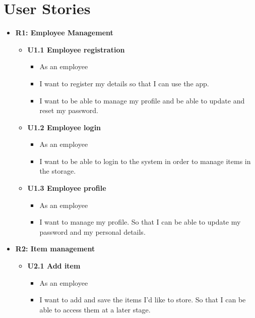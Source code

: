 \documentclass[hidelinks, 12pt, a4paper]{article}
\begin{document}
\section{User Stories}
\begin{itemize}
    \item \textbf{R1: Employee Management}
    \begin{itemize}
        \item \textbf{U1.1 Employee registration}
        \begin{itemize}
            \item As an employee
            \item I want to register my details so that I can use the app.
            \item I want to be able to manage my profile and be able to update and reset my password.
        \end{itemize}
        \item \textbf{U1.2 Employee login}
        \begin{itemize}
            \item As an employee
            \item I want to be able to login to the system in order to manage items in the storage.
        \end{itemize}
        \item \textbf{U1.3 Employee profile}
        \begin{itemize}
            \item As an employee
            \item I want to manage my profile. So that I can be able to update my password and my personal details.
        \end{itemize}
    \end{itemize}

    \item \textbf{R2: Item management}
    \begin{itemize}
        \item \textbf{U2.1 Add item}
        \begin{itemize}
            \item As an employee
            \item I want to add and save the items I'd like to store. So that I can be able to access them at a later stage.


\end{itemize}
\end{itemize}
\end{itemize}
\end{document}
